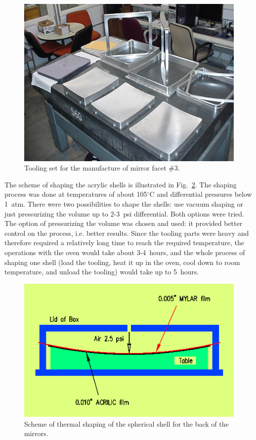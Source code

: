 \begin{figure}[ht]
    \centering
    \includegraphics[width=1.0\linewidth]{images/Tool_on_tbl.jpg}
    \caption{Tooling set for the manufacture of mirror facet \#3.}
    \label{fig:Tool_on_tbl}
\end{figure}

The scheme of shaping the acrylic shells is illustrated in  Fig.~\ref{fig:Shaping_new}. The shaping process
was done at temperatures of about 105$^\circ$C and differential pressures below 1~atm. There were two
possibilities to shape the shells: use vacuum shaping or just pressurizing the volume up to 2-3~psi differential.
Both options were tried. The option of pressurizing the volume was chosen and used: it provided better control
on the process, i.e. better results. Since the tooling parts were heavy and therefore required a relatively long
time to reach the required temperature, the operations with the oven would take about 3-4~hours, and the whole
process of shaping one shell (load the tooling, heat it up in the oven, cool down to room temperature, and unload
the tooling) would take up to 5~hours.

\begin{figure}[ht]
    \centering
    \includegraphics[width=1.0\linewidth]{images/Shaping_new.png}
    \caption{Scheme of thermal shaping of the spherical shell for the back of the mirrors.}
    \label{fig:Shaping_new}
\end{figure}

